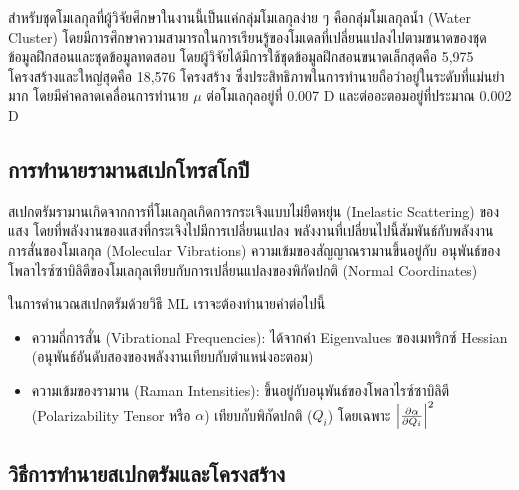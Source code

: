 สำหรับชุดโมเลกุลที่ผู้วิจัยศึกษาในงานนี้เป็นแค่กลุ่มโมเลกุลง่าย ๆ คือกลุ่มโมเลกุลน้ำ (Water Cluster) โดยมีการศึกษาความสามารถในการเรียนรู้ของโมเดลที่เปลี่ยนแปลงไปตามขนาดของชุดข้อมูลฝึกสอนและชุดข้อมูลทดสอบ โดยผู้วิจัยได้มีการใช้ชุดข้อมูลฝึกสอนขนาดเล็กสุดคือ 5,975 โครงสร้างและใหญ่สุดคือ 18,576 โครงสร้าง ซึ่งประสิทธิภาพในการทำนายถือว่าอยู่ในระดับที่แม่นยำมาก โดยมีค่าคลาดเคลื่อนการทำนาย $\mu$ ต่อโมเลกุลอยู่ที่ 0.007 D และต่ออะตอมอยู่ที่ประมาณ 0.002 D

\subsection{การทำนายรามานสเปกโทรสโกปี}
\label{ssec:pred_spec_raman}

สเปกตรัมรามานเกิดจากการที่โมเลกุลเกิดการกระเจิงแบบไม่ยืดหยุ่น (Inelastic Scattering) ของแสง โดยที่พลังงานของแสงที่กระเจิงไปมีการเปลี่ยนแปลง พลังงานที่เปลี่ยนไปนี้สัมพันธ์กับพลังงานการสั่นของโมเลกุล (Molecular Vibrations) ความเข้มของสัญญาณรามานขึ้นอยู่กับ อนุพันธ์ของโพลาไรซ์ซาบิลิตีของโมเลกุลเทียบกับการเปลี่ยนแปลงของพิกัดปกติ (Normal Coordinates)

ในการคำนวณสเปกตรัมด้วยวิธี ML เราจะต้องทำนายค่าต่อไปนี้
%
\begin{itemize}[topsep=0pt,noitemsep]\setlength\itemsep{0.5em}
    \item ความถี่การสั่น (Vibrational Frequencies): ได้จากค่า Eigenvalues ของเมทริกซ์ Hessian (อนุพันธ์อันดับสองของพลังงานเทียบกับตำแหน่งอะตอม)
    
    \item ความเข้มของรามาน (Raman Intensities): ขึ้นอยู่กับอนุพันธ์ของโพลาไรซ์ซาบิลิตี (Polarizability Tensor หรือ $\alpha$) เทียบกับพิกัดปกติ ($Q_i$) โดยเฉพาะ $\abs{\pdv{\alpha}{Q_i}}^2$
\end{itemize}

\subsection{วิธีการทำนายสเปกตรัมและโครงสร้าง}
\label{ssec:pred_spec_struct}

